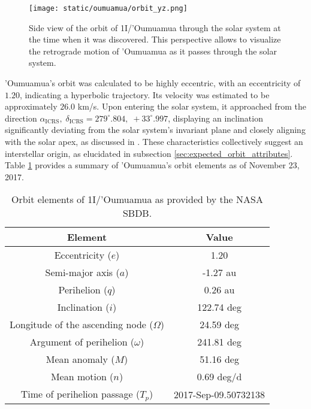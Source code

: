 \begin{figure}[H]
  \centering
  \texttt{[image: static/oumuamua/orbit\_yz.png]}
  \caption[Side view of the orbit of 1I/'Oumuamua through the solar system]
  {
    Side view of the orbit of 1I/'Oumuamua through the solar system at the time when it was
    discovered. This perspective allows to visualize the retrograde motion of
    'Oumuamua as it passes through the solar system.
  }
  \label{fig:oumuamua_orbit_yz}
\end{figure}

'Oumuamua's orbit was calculated to be highly eccentric, with an eccentricity of
$1.20$, indicating a hyperbolic trajectory. Its velocity was estimated to be
approximately $26.0$ km/s. Upon entering the solar system, it approached from
the direction $\alpha_{\text{ICRS}},\; \delta_{\text{ICRS}} = 279^\circ.804,\;
  +33^\circ.997$, displaying an inclination significantly deviating from the solar
system's invariant plane and closely aligning with the solar apex, as discussed
in \cite{mamajek2017}. These characteristics collectively suggest an
interstellar origin, as elucidated in subsection
\ref{sec:expected_orbit_attributes}. Table \ref{tab:oumuamua_elements} provides
a summary of 'Oumuamua's orbit elements as of November 23, 2017.

\begin{table}[H]
  \centering
  \begin{tabular}{|c|c|}
    \hline
    Element                                    & Value                \\
    \hline
    Eccentricity ($e$)                         & 1.20                 \\
    Semi-major axis ($a$)                      & -1.27 au             \\
    Perihelion ($q$)                           & 0.26 au              \\
    Inclination ($i$)                          & 122.74 deg           \\
    Longitude of the ascending node ($\Omega$) & 24.59 deg            \\
    Argument of perihelion ($\omega$)          & 241.81 deg           \\
    Mean anomaly ($M$)                         & 51.16 deg            \\
    Mean motion ($n$)                          & 0.69 deg/d           \\
    Time of perihelion passage ($T_p$)         & 2017-Sep-09.50732138 \\
    \hline
  \end{tabular}
  \caption{Orbit elements of 1I/'Oumuamua as provided by the NASA SBDB.}
  \label{tab:oumuamua_elements}
\end{table}

